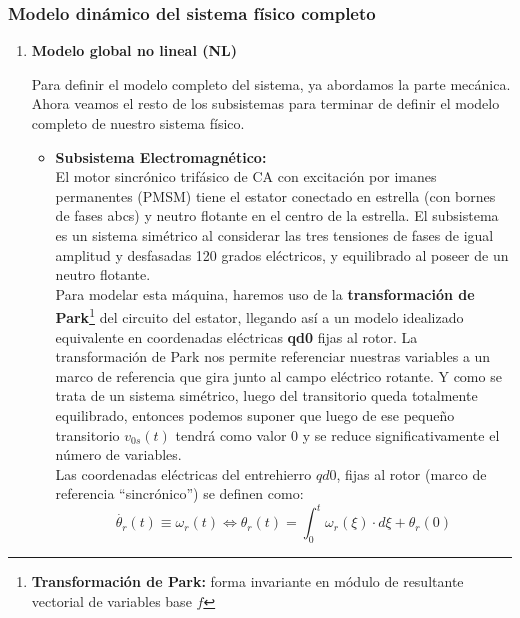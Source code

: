 \documentclass[10pt]{article}
\begin{document}
\begin{itemize}
\end{itemize}

\subsubsection{Modelo dinámico del sistema físico completo}

\begin{enumerate}
    \renewcommand{\theenumi}{\alph{enumi}} %
    \item \textbf{Modelo global no lineal (NL)}
    
    Para definir el modelo completo del sistema, ya abordamos la parte mecánica. Ahora veamos el resto de los subsistemas para terminar de definir el modelo completo de nuestro sistema físico.
	\begin{itemize}
		\item \textbf{Subsistema Electromagnético:}\vspace{0.3cm}\\
		El motor sincrónico trifásico de CA con excitación por imanes permanentes (PMSM) tiene el estator conectado en estrella (con bornes de fases abcs) y neutro flotante en el centro de la estrella.
		El subsistema es un sistema simétrico al considerar las tres tensiones de fases de igual amplitud y desfasadas 120 grados eléctricos, y equilibrado al poseer de un neutro flotante.
		\vspace{0.3cm}\\
		Para modelar esta máquina, haremos uso de la \textbf{transformación de Park}\footnote[1]{\textbf{Transformación de Park:} forma invariante en módulo de resultante vectorial de variables base $f$} del circuito del estator, llegando así a un modelo idealizado equivalente en coordenadas eléctricas \textbf{qd0} fijas al rotor.
		La transformación de Park nos permite referenciar nuestras variables a un marco de referencia que gira junto al campo eléctrico rotante.
		Y como se trata de un sistema simétrico, luego del transitorio queda totalmente equilibrado, entonces podemos suponer que luego de ese pequeño transitorio $v_{0s}(t)$ tendrá como valor $0$ y se reduce significativamente el número de variables.
		\vspace{0.3cm}\\
		Las coordenadas eléctricas del entrehierro $qd0$, fijas al rotor (marco de referencia “sincrónico”) se definen como:
		\begin{equation}
			\dot{\theta_{r}}\left ( t \right )\equiv \omega_{r}\left ( t \right )\Leftrightarrow \theta_{r}\left ( t \right )=\int_{0}^{t}\omega_{r}\left ( \xi \right )\cdot d\xi + \theta_{r}\left ( 0 \right )

\end{equation}
\end{itemize}
\end{enumerate}
\end{document}
